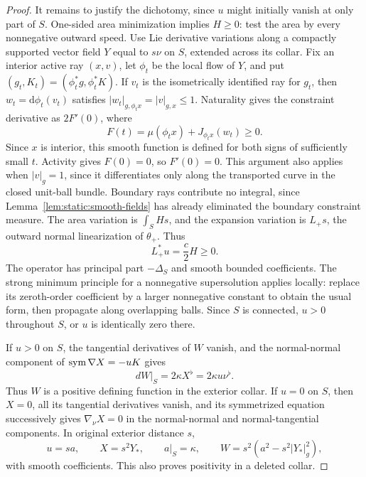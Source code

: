 \begin{proof}
It remains to justify the dichotomy, since $u$ might initially
vanish at only part of $S$.  One-sided area minimization implies
$H\geq0$: test the area by every nonnegative outward speed.
Use Lie derivative variations along a compactly supported vector field
$Y$ equal to $s\nu$ on $S$, extended across its collar.  Fix an interior
active ray $(x,v)$, let $\phi_t$ be the local flow of $Y$, and put
$(g_t,K_t)=(\phi_t^*g,\phi_t^*K)$.  If $v_t$ is the isometrically
identified ray for $g_t$, then $w_t=\mathrm d\phi_t(v_t)$ satisfies
$|w_t|_{g,\phi_t x}=|v|_{g,x}\leq1$.  Naturality gives the constraint
derivative as $2F'(0)$, where
\[
 F(t)=\mu(\phi_t x)+J_{\phi_t x}(w_t)\geq0.
\]
Since $x$ is interior, this smooth function is defined for both signs
of sufficiently small $t$.  Activity gives $F(0)=0$, so $F'(0)=0$.
This argument also applies when $|v|_g=1$, since it differentiates only
along the transported curve in the closed unit-ball bundle.  Boundary
rays contribute no integral, since Lemma~\ref{lem:static:smooth-fields}
has already eliminated the boundary constraint measure.  The area
variation is $\int_S Hs$, and the expansion variation is
$L_+s$, the outward normal linearization of $\theta_+$.
Thus
\begin{equation}\label{eq:static:boundary-adjoint}
 L_+^*u=\frac c2 H\geq0.
\end{equation}
The operator has principal part $-\Delta_S$ and smooth bounded
coefficients.  The strong minimum principle for a nonnegative
supersolution applies locally: replace its zeroth-order coefficient
by a larger nonnegative constant to obtain the usual form, then
propagate along overlapping balls.  Since $S$ is connected,
$u>0$ throughout $S$, or $u$ is identically zero there.

If $u>0$ on $S$, the tangential derivatives of $W$ vanish, and
the normal-normal component of $\operatorname{sym}\nabla X=-uK$ gives
\begin{equation}\label{eq:static:positive-boundary}
 dW|_S=2\kappa X^\flat=2\kappa u\nu^\flat.
\end{equation}
Thus $W$ is a positive defining function in the exterior collar.
If $u=0$ on $S$, then $X=0$, all its tangential derivatives vanish,
and its symmetrized equation successively gives
$\nabla_\nu X=0$ in the normal-normal and normal-tangential
components.  In original exterior distance $s$,
\begin{equation}\label{eq:static:zero-boundary}
 u=s a,\qquad X=s^2Y_*,\qquad a|_S=\kappa,
 \qquad W=s^2(a^2-s^2|Y_*|_g^2),
\end{equation}
with smooth coefficients.  This also proves positivity in a
deleted collar.
\end{proof}

